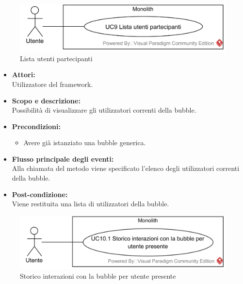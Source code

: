
\begin{figure}[H]
	\centering
	\includegraphics[width=15cm]{../../documenti/AnalisiDeiRequisiti/Diagrammi_img/usecase/uc1_14.png}
	\caption{\UCCaption{} Lista utenti partecipanti}
\end{figure}

\begin{itemize}
	\item \textbf{Attori:}
	\\Utilizzatore del framework.
	\item \textbf{Scopo e descrizione:} 
	\\Possibilità di visualizzare gli utilizzatori correnti della bubble.
	\item \textbf{Precondizioni:}
	\begin{itemize}
		\item Avere già istanziato una bubble generica.
	\end{itemize}
	\item \textbf{Flusso principale degli eventi:}
	\\Alla chiamata del metodo viene specificato l'elenco degli utilizzatori correnti della bubble.
	\item \textbf{Post-condizione:}
	\\Viene restituita una lista di utilizzatori della bubble.
\end{itemize}

\begin{samepage}
\nopagebreak
\begin{figure}[H]
	\centering
	\includegraphics[width=15cm]{../../documenti/AnalisiDeiRequisiti/Diagrammi_img/usecase/uc1_15.png}
	\caption{\UCCCaption{} Storico interazioni con la bubble per utente presente}
\end{figure}
\end{samepage}

